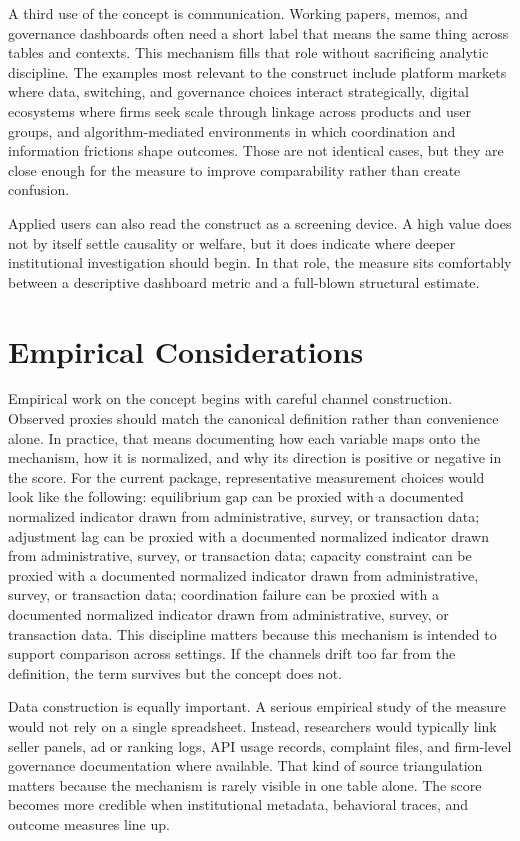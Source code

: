 \documentclass[12pt]{article}
\begin{document}
A third use of the concept is communication. Working papers, memos, and governance dashboards often need a short label that means the same thing across tables and contexts. This mechanism fills that role without sacrificing analytic discipline. The examples most relevant to the construct include platform markets where data, switching, and governance choices interact strategically, digital ecosystems where firms seek scale through linkage across products and user groups, and algorithm-mediated environments in which coordination and information frictions shape outcomes. Those are not identical cases, but they are close enough for the measure to improve comparability rather than create confusion.

Applied users can also read the construct as a screening device. A high value does not by itself settle causality or welfare, but it does indicate where deeper institutional investigation should begin. In that role, the measure sits comfortably between a descriptive dashboard metric and a full-blown structural estimate.

\section{Empirical Considerations}
Empirical work on the concept begins with careful channel construction. Observed proxies should match the canonical definition rather than convenience alone. In practice, that means documenting how each variable maps onto the mechanism, how it is normalized, and why its direction is positive or negative in the score. For the current package, representative measurement choices would look like the following: equilibrium gap can be proxied with a documented normalized indicator drawn from administrative, survey, or transaction data; adjustment lag can be proxied with a documented normalized indicator drawn from administrative, survey, or transaction data; capacity constraint can be proxied with a documented normalized indicator drawn from administrative, survey, or transaction data; coordination failure can be proxied with a documented normalized indicator drawn from administrative, survey, or transaction data. This discipline matters because this mechanism is intended to support comparison across settings. If the channels drift too far from the definition, the term survives but the concept does not.

Data construction is equally important. A serious empirical study of the measure would not rely on a single spreadsheet. Instead, researchers would typically link seller panels, ad or ranking logs, API usage records, complaint files, and firm-level governance documentation where available. That kind of source triangulation matters because the mechanism is rarely visible in one table alone. The score becomes more credible when institutional metadata, behavioral traces, and outcome measures line up.
\end{document}
